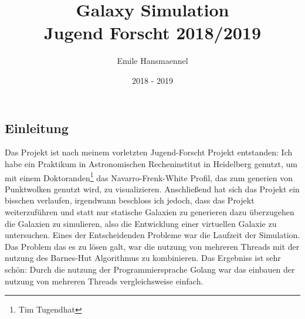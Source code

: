 \documentclass[a4paper, 10pt]{article}
\begin{document}
\title{\huge Galaxy Simulation\\ \large Jugend Forscht 2018/2019}
\date{2018 - 2019}
\author{Emile Hansmaennel}%

\maketitle

\begin{multicols*}{2}[
]

\renewcommand{\contentsname}{Inhaltsverzeichnis} \tableofcontents[Inhalt]

\section{Einleitung}
Das Projekt ist nach meinem vorletzten Jugend-Forscht Projekt entstanden: Ich
habe ein Praktikum in Astronomischen Recheninstitut in Heidelberg genutzt, um
mit einem Doktoranden\footnote{Tim Tugendhat} das Navarro-Frenk-White Profil,
das zum generien von Punktwolken genutzt wird, zu visualizieren. Anschließend
hat sich das Projekt ein bisschen verlaufen, irgendwann beschloss ich jedoch,
dass das Projekt weiterzuführen und statt nur statische Galaxien zu generieren
dazu überzugehen die Galaxien zu simulieren, also die Entwicklung einer
virtuellen Galaxie zu untersuchen.  Eines der Entscheidenden Probleme war die
Laufzeit der Simulation. Das Problem das es zu lösen galt, war die nutzung von
mehreren Threads mit der nutzung des Barnes-Hut Algorithmus zu kombinieren.
Das Ergebniss ist sehr schön: Durch die nutzung der Programmiersprache Golang
war das einbauen der nutzung von mehreren Threads vergleichsweise einfach.


\end{multicols*}
\end{document}
